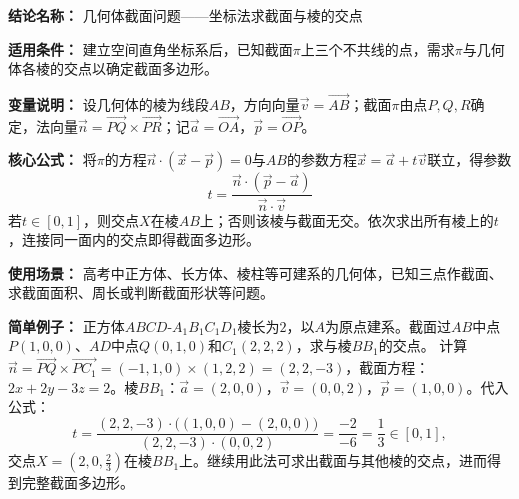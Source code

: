 \textbf{结论名称：} 几何体截面问题——坐标法求截面与棱的交点

\textbf{适用条件：} 建立空间直角坐标系后，已知截面$\pi$上三个不共线的点，需求$\pi$与几何体各棱的交点以确定截面多边形。

\textbf{变量说明：} 设几何体的棱为线段$AB$，方向向量$\vec{v}=\overrightarrow{AB}$；截面$\pi$由点$P,Q,R$确定，法向量$\vec{n}=\overrightarrow{PQ}\times\overrightarrow{PR}$；记$\vec{a}=\overrightarrow{OA}$，$\vec{p}=\overrightarrow{OP}$。

\textbf{核心公式：}
将$\pi$的方程$\vec{n}\cdot(\vec{x}-\vec{p})=0$与$AB$的参数方程$\vec{x}=\vec{a}+t\vec{v}$联立，得参数
\[
\boxed{ t = \frac{\vec{n}\cdot(\vec{p}-\vec{a})}{\vec{n}\cdot\vec{v}} }
\]
若$t\in[0,1]$，则交点$X$在棱$AB$上；否则该棱与截面无交。依次求出所有棱上的$t$，连接同一面内的交点即得截面多边形。

\textbf{使用场景：} 高考中正方体、长方体、棱柱等可建系的几何体，已知三点作截面、求截面面积、周长或判断截面形状等问题。

\textbf{简单例子：}
正方体$ABCD$-$A_1B_1C_1D_1$棱长为$2$，以$A$为原点建系。截面过$AB$中点$P(1,0,0)$、$AD$中点$Q(0,1,0)$和$C_1(2,2,2)$，求与棱$BB_1$的交点。
计算$\vec{n}=\overrightarrow{PQ}\times\overrightarrow{PC_1}=(-1,1,0)\times(1,2,2)=(2,2,-3)$，截面方程：$2x+2y-3z=2$。棱$BB_1$：$\vec{a}=(2,0,0)$，$\vec{v}=(0,0,2)$，$\vec{p}=(1,0,0)$。代入公式：
\[
t = \frac{(2,2,-3)\cdot\bigl((1,0,0)-(2,0,0)\bigr)}{(2,2,-3)\cdot(0,0,2)} = \frac{-2}{-6}=\frac13\in[0,1],
\]
交点$X=(2,0,\tfrac23)$在棱$BB_1$上。继续用此法可求出截面与其他棱的交点，进而得到完整截面多边形。
